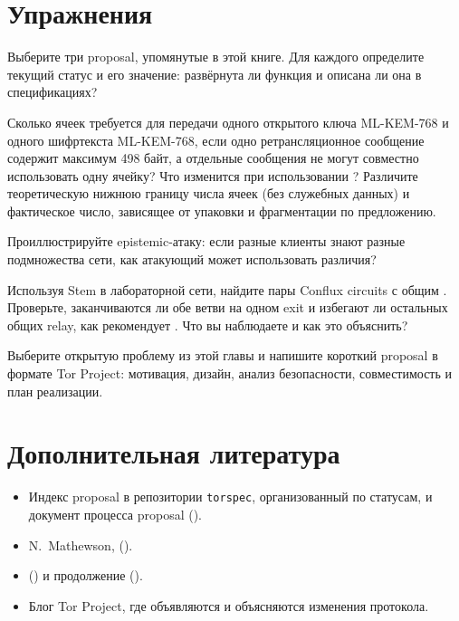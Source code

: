 \section*{Упражнения}

\begin{esercizio}[1]\label{es:31-stato}
Выберите три proposal, упомянутые в этой книге. Для каждого определите текущий статус и его значение: развёрнута ли функция и описана ли она в спецификациях?
\end{esercizio}

\begin{esercizio}[1]\label{es:31-celle}
Сколько ячеек требуется для передачи одного открытого ключа ML-KEM-768 и одного шифртекста ML-KEM-768, если одно ретрансляционное сообщение содержит максимум 498 байт, а отдельные сообщения не могут совместно использовать одну ячейку? Что изменится при использовании ? Различите теоретическую нижнюю границу числа ячеек (без служебных данных) и фактическое число, зависящее от упаковки и фрагментации по предложению.
\end{esercizio}

\begin{esercizio}[2]\label{es:31-epistemico}
Проиллюстрируйте epistemic-атаку: если разные клиенты знают разные подмножества сети, как атакующий может использовать различия?
\end{esercizio}

\begin{esercizio}[2]\label{es:31-conflux}
Используя Stem в лабораторной сети, найдите пары Conflux circuits с общим . Проверьте, заканчиваются ли обе ветви на одном exit и избегают ли остальных общих relay, как рекомендует . Что вы наблюдаете и как это объяснить?
\end{esercizio}

\begin{esercizio}[3]\label{es:31-proposta}
Выберите открытую проблему из этой главы и напишите короткий proposal в формате Tor Project: мотивация, дизайн, анализ безопасности, совместимость и план реализации.
\end{esercizio}

\section*{Дополнительная литература}
\begin{itemize}
  \item Индекс proposal в репозитории \texttt{torspec}, организованный по статусам, и документ процесса proposal ().
  \item N.~Mathewson,  ().
  \item {} () и продолжение ().
  \item Блог Tor Project, где объявляются и объясняются изменения протокола.
\end{itemize}
